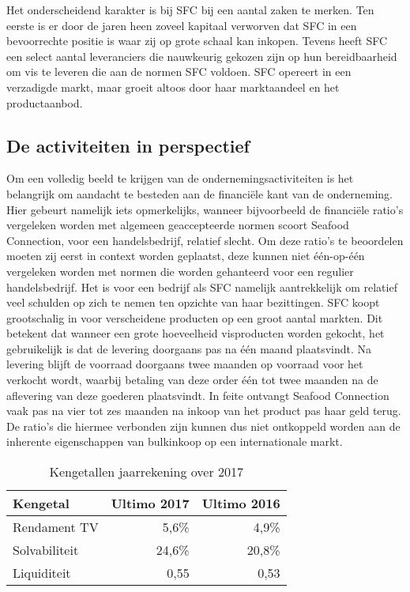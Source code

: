 Het onderscheidend karakter is bij SFC bij een aantal zaken te merken. Ten eerste is er door de jaren heen zoveel kapitaal verworven dat SFC in een bevoorrechte positie is waar zij op grote schaal kan inkopen. Tevens heeft SFC een select aantal leveranciers die nauwkeurig gekozen zijn op hun bereidbaarheid om vis te leveren die aan de normen SFC voldoen. SFC opereert in een verzadigde markt, maar groeit altoos door haar marktaandeel en het productaanbod.

\subsection{De activiteiten in perspectief} \label{beschr:activiteiten}
Om een volledig beeld te krijgen van de ondernemingsactiviteiten is het belangrijk om aandacht te besteden aan de financiële kant van de onderneming. Hier gebeurt namelijk iets opmerkelijks, wanneer bijvoorbeeld de financiële ratio's vergeleken worden met algemeen geaccepteerde normen scoort Seafood Connection, voor een handelsbedrijf, relatief slecht. Om deze ratio’s te beoordelen moeten zij eerst in context worden geplaatst, deze kunnen niet één-op-één vergeleken worden met normen die worden gehanteerd voor een regulier handelsbedrijf. Het is voor een bedrijf als SFC namelijk aantrekkelijk om relatief veel schulden op zich te nemen ten opzichte van haar bezittingen. SFC koopt grootschalig in voor verscheidene producten op een groot aantal markten. Dit betekent dat wanneer een grote hoeveelheid visproducten worden gekocht, het gebruikelijk is dat de levering doorgaans pas na één maand plaatsvindt. Na levering blijft de voorraad doorgaans twee maanden op voorraad voor het verkocht wordt, waarbij betaling van deze order één tot twee maanden na de aflevering van deze goederen plaatsvindt. In feite ontvangt Seafood Connection vaak pas na vier tot zes maanden na inkoop van het product pas haar geld terug. De ratio’s die hiermee verbonden zijn kunnen dus niet ontkoppeld worden aan de inherente eigenschappen van bulkinkoop op een internationale markt. \citep{jaarrapport2017}

\begin{table}[h]
    \centering
    \caption{Kengetallen jaarrekening over 2017 \citep{jaarrapport2017}}
    \begin{tabular}{l r r}
        \toprule
        \textbf{Kengetal} & \textbf{Ultimo 2017} & \textbf{Ultimo 2016} \\
        \midrule
        Rendament TV & 5,6\% & 4,9\% \\
        Solvabiliteit & 24,6\% & 20,8\% \\
        Liquiditeit & 0,55 & 0,53 \\
        \bottomrule
    \end{tabular}
    \label{tab:kengetallen}
\end{table}


